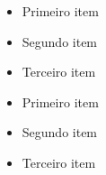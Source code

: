 \begin{itemize}
    \item Primeiro item
    \item Segundo item
    \item Terceiro item
\end{itemize}

\begin{itemize}
    \item Primeiro item
    \item Segundo item
    \item Terceiro item
\end{itemize}



\citep{8890660} %
\cite{8890660} %
